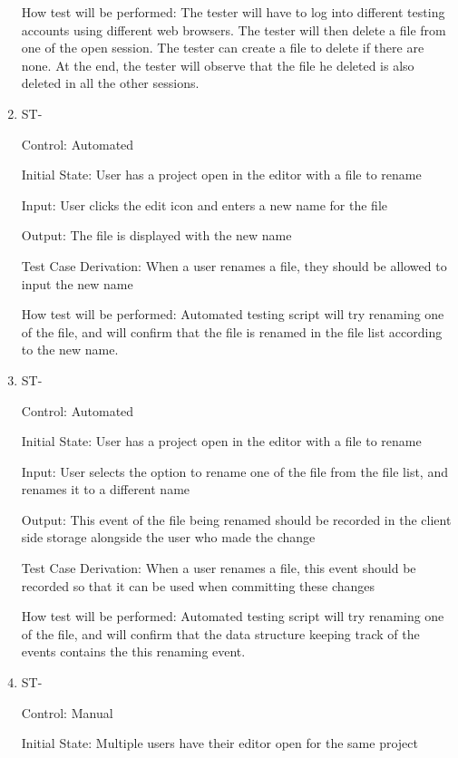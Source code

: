 \documentclass[12pt, titlepage]{article}
\newcounter{TESTID}
\newcommand\TESTNUM{\stepcounter{TESTID}\theTESTID}
\begin{document}
\begin{enumerate}
		How test will be performed: The tester will have to log into different testing accounts using different web browsers. The tester will then delete a file from one of the open session. The tester can create a file to delete if there are none. At the end, the tester will observe that the file he deleted is also deleted in all the other sessions.
		
		\item{ST-\TESTNUM\\}
		
		Control: Automated
		
		Initial State: User has a project open in the editor with a file to rename
		
		Input: User clicks the edit icon and enters a new name for the file
		
		Output: The file is displayed with the new name
		
		Test Case Derivation: When a user renames a file, they should be allowed to input the new name
		
		How test will be performed: Automated testing script will try renaming one of the file, and will confirm that the file is renamed in the file list according to the new name.
		
		\item{ST-\TESTNUM\\}
		
		Control: Automated
		
		Initial State: User has a project open in the editor with a file to rename
		
		Input: User selects the option to rename one of the file from the file list, and renames it to a different name
		
		Output: This event of the file being renamed should be recorded in the client side storage alongside the user who made the change
		
		Test Case Derivation: When a user renames a file, this event should be recorded so that it can be used when committing these changes
		
		How test will be performed: Automated testing script will try renaming one of the file, and will confirm that the data structure keeping track of the events contains the this renaming event.
		
		\item{ST-\TESTNUM\\}
		
		Control: Manual
		
		Initial State: Multiple users have their editor open for the same project
		

\end{enumerate}
\end{document}
